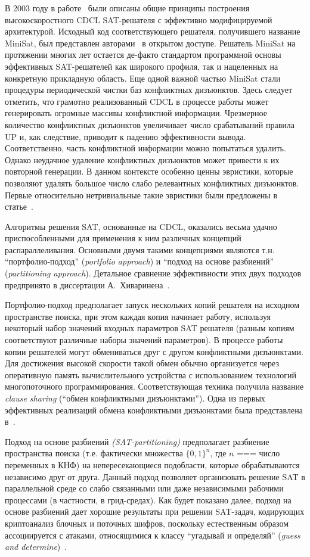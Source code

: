 В 2003 году в работе~\cite{minisat} были описаны общие принципы построения высокоскоростного CDCL SAT-решателя с эффективно модифицируемой архитектурой.
Исходный код соответствующего решателя, получившего название MiniSat, был представлен авторами~\cite{minisat} в открытом доступе.
Решатель MiniSat на протяжении многих лет остается де-факто стандартом программной основы эффективных SAT-решателей как широкого профиля, так и нацеленных на конкретную прикладную область.
Еще одной важной частью MiniSat стали процедуры периодической чистки баз конфликтных дизъюнктов.
Здесь следует отметить, что грамотно реализованный CDCL в процессе работы может генерировать огромные массивы конфликтной информации.
Чрезмерное количество конфликтных дизъюнктов увеличивает число срабатываний правила UP и, как следствие, приводит к падению эффективности вывода.
Соответственно, часть конфликтной информации можно попытаться удалить.
Однако неудачное удаление конфликтных дизъюнктов может привести к их повторной генерации.
В данном контексте особенно ценны эвристики, которые позволяют удалять большое число слабо релевантных конфликтных дизъюнктов.
Первые относительно нетривиальные такие эвристики были предложены в статье~\cite{glucose}.

Алгоритмы решения SAT, основанные на CDCL, оказались весьма удачно приспособленными для применения к ним различных концепций распараллеливания.
Основными двумя такими концепциями являются т.н. \enquote{портфолио-подход} (\textit{portfolio approach}) и \enquote{подход на основе разбиений} (\textit{partitioning approach}).
Детальное сравнение эффективности этих двух подходов предпринято в диссертации А.~Хиваринена~\cite{hyvarinen2011}.

Портфолио-подход предполагает запуск нескольких копий решателя на исходном пространстве поиска, при этом каждая копия начинает работу, используя некоторый набор значений входных параметров SAT решателя (разным копиям соответствуют различные наборы значений параметров).
В процессе работы копии решателей могут обмениваться друг с другом конфликтными дизъюнктами.
Для достижения высокой скорости такой обмен обычно организуется через оперативную память вычислительного устройства с использованием технологий многопоточного программирования.
Соответствующая техника получила название \textit{clause sharing} (\enquote{обмен конфликтными дизъюнктами}).
Одна из первых эффективных реализаций обмена конфликтными дизъюнктами была представлена в~\cite{hamadi2011}.

Подход на основе разбиений \textit{(SAT-partitioning)} предполагает разбиение пространства поиска (т.е. фактически множества $\{ 0,1 \}^{n}$, где $n$ === число переменных в КНФ) на непересекающиеся подобласти, которые обрабатываются независимо друг от друга.
Данный подход позволяет организовать решение SAT в параллельной среде со слабо связанными или даже независимыми рабочими процессами (в частности, в грид-средах).
Как будет показано далее, подход на основе разбиений дает хорошие результаты при решении SAT-задач, кодирующих криптоанализ блочных и поточных шифров, поскольку естественным образом ассоциируется с атаками, относящимися к классу \enquote{угадывай и определяй} (\textit{guess and determine})~\cite{bard2009}.

